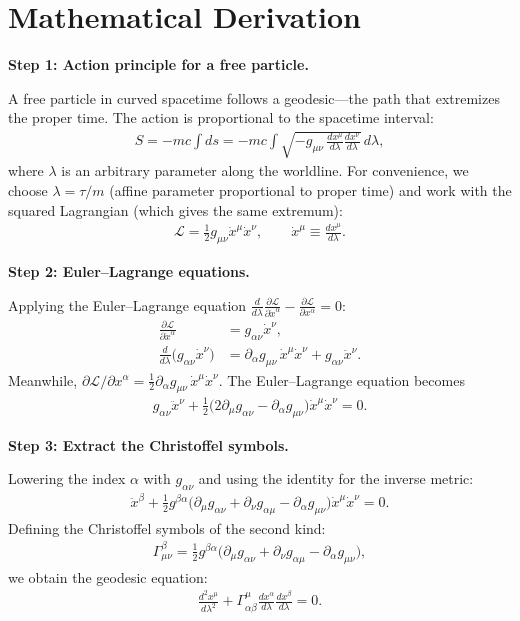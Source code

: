 \documentclass[11pt,openright]{book}
\begin{document}
\section*{Mathematical Derivation}

\textbf{Step 1: Action principle for a free particle.}

A free particle in curved spacetime follows a geodesic---the path that extremizes the proper time. The action is proportional to the spacetime interval:
\begin{align}
S = -mc\int ds = -mc\int \sqrt{-g_{\mu\nu}\,\frac{dx^\mu}{d\lambda}\frac{dx^\nu}{d\lambda}}\,d\lambda,
\end{align}
where $\lambda$ is an arbitrary parameter along the worldline. For convenience, we choose $\lambda = \tau/m$ (affine parameter proportional to proper time) and work with the squared Lagrangian (which gives the same extremum):
\begin{align}
\mathcal{L} = \frac{1}{2}g_{\mu\nu}\dot{x}^\mu\dot{x}^\nu, \qquad \dot{x}^\mu \equiv \frac{dx^\mu}{d\lambda}.
\end{align}

\textbf{Step 2: Euler--Lagrange equations.}

Applying the Euler--Lagrange equation $\frac{d}{d\lambda}\frac{\partial\mathcal{L}}{\partial\dot{x}^\alpha} - \frac{\partial\mathcal{L}}{\partial x^\alpha} = 0$:
\begin{align}
\frac{\partial\mathcal{L}}{\partial\dot{x}^\alpha} &= g_{\alpha\nu}\dot{x}^\nu, \\
\frac{d}{d\lambda}\bigl(g_{\alpha\nu}\dot{x}^\nu\bigr) &= \partial_\alpha g_{\mu\nu}\,\dot{x}^\mu\dot{x}^\nu + g_{\alpha\nu}\ddot{x}^\nu.
\end{align}
Meanwhile, $\partial\mathcal{L}/\partial x^\alpha = \frac{1}{2}\partial_\alpha g_{\mu\nu}\,\dot{x}^\mu\dot{x}^\nu$. The Euler--Lagrange equation becomes
\begin{align}
g_{\alpha\nu}\ddot{x}^\nu + \frac{1}{2}\bigl(2\partial_\mu g_{\alpha\nu} - \partial_\alpha g_{\mu\nu}\bigr)\dot{x}^\mu\dot{x}^\nu = 0.
\end{align}

\textbf{Step 3: Extract the Christoffel symbols.}

Lowering the index $\alpha$ with $g_{\alpha\nu}$ and using the identity for the inverse metric:
\begin{align}
\ddot{x}^\beta + \frac{1}{2}g^{\beta\alpha}\bigl(\partial_\mu g_{\alpha\nu} + \partial_\nu g_{\alpha\mu} - \partial_\alpha g_{\mu\nu}\bigr)\dot{x}^\mu\dot{x}^\nu = 0.
\end{align}
Defining the Christoffel symbols of the second kind:
\begin{align}
\Gamma^\beta_{\mu\nu} = \frac{1}{2}g^{\beta\alpha}\bigl(\partial_\mu g_{\alpha\nu} + \partial_\nu g_{\alpha\mu} - \partial_\alpha g_{\mu\nu}\bigr),
\end{align}
we obtain the geodesic equation:
\begin{align}
\boxed{\frac{d^2 x^\mu}{d\lambda^2} + \Gamma^\mu_{\alpha\beta}\frac{dx^\alpha}{d\lambda}\frac{dx^\beta}{d\lambda} = 0.}
\end{align}
\end{document}
